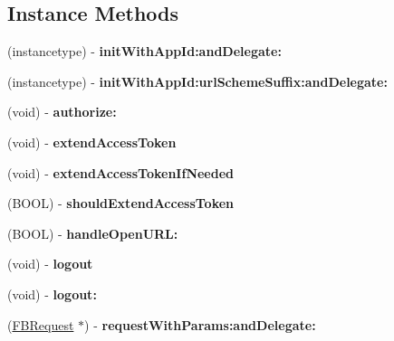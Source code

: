 \subsection*{Instance Methods}
\begin{DoxyCompactItemize}
\item 
\mbox{\label{interfaceFacebook_a3e3063f63293e9a9f7518b7275fae59a}} 
(instancetype) -\/ {\bfseries init\+With\+App\+Id\+:and\+Delegate\+:}
\item 
\mbox{\label{interfaceFacebook_adf179bd2617bdbb233b2b5db98efaf01}} 
(instancetype) -\/ {\bfseries init\+With\+App\+Id\+:url\+Scheme\+Suffix\+:and\+Delegate\+:}
\item 
\mbox{\label{interfaceFacebook_a57c1792ab63e37d31856d9e1c7cf35b6}} 
(void) -\/ {\bfseries authorize\+:}
\item 
\mbox{\label{interfaceFacebook_aaeda683efcfaf74bf88a446cf9829fd6}} 
(void) -\/ {\bfseries extend\+Access\+Token}
\item 
\mbox{\label{interfaceFacebook_a6b7ad0f8993895f182d002ba3d390d04}} 
(void) -\/ {\bfseries extend\+Access\+Token\+If\+Needed}
\item 
\mbox{\label{interfaceFacebook_a40f4232e29af0ce94c74152f2623f0d4}} 
(B\+O\+OL) -\/ {\bfseries should\+Extend\+Access\+Token}
\item 
\mbox{\label{interfaceFacebook_af59e46399f97cdb3f7f235822a30f06f}} 
(B\+O\+OL) -\/ {\bfseries handle\+Open\+U\+R\+L\+:}
\item 
\mbox{\label{interfaceFacebook_a6e0221b80dba8a301e720897fec6e193}} 
(void) -\/ {\bfseries logout}
\item 
\mbox{\label{interfaceFacebook_a204f10894608b3e10943e15d9861c9be}} 
(void) -\/ {\bfseries logout\+:}
\item 
\mbox{\label{interfaceFacebook_a80611b3dd62992ad47e6de425a8b67dd}} 
(\hyperlink{interfaceFBRequest}{F\+B\+Request} $\ast$) -\/ {\bfseries request\+With\+Params\+:and\+Delegate\+:}

\end{DoxyCompactItemize}

